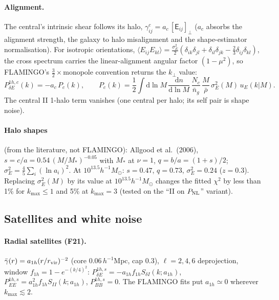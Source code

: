 \documentclass[11pt]{article}
\newcommand{\kmax}{k_{\max}}
\newcommand{\PNL}{P_{\rm NL}}
\newcommand{\dd}{\mathrm{d}}
\begin{document}
\paragraph{Alignment.} The central's intrinsic shear follows its halo,
$\gamma^c_{ij} = a_c\,[\mathsf E_{ij}]_\perp$ ($a_c$ absorbs the alignment strength,
the galaxy to halo misalignment and the shape-estimator normalisation). For
isotropic orientations,
$\langle E_{ij}E_{kl}\rangle = \tfrac{\sigma_E^2}{2}(\delta_{ik}\delta_{jl} + \delta_{il}\delta_{jk} - \tfrac23\delta_{ij}\delta_{kl})$,
the cross spectrum carries the linear-alignment angular factor $(1 - \mu^2)$, so
FLAMINGO's $\tfrac32\times$monopole convention returns the $k_\perp$ value:
\begin{equation}
\boxed{P^{1h,c}_{\delta E}(k) = -a_c\,P_c(k),\qquad
P_c(k) = \frac12\int\dd\ln M\,\frac{\dd n}{\dd\ln M}\,\frac{N_c}{\bar n_g}\,\frac{M}{\bar\rho}\,\sigma_E^2(M)\,u_E(k|M).}
\label{eq:central}
\end{equation}
The central II 1-halo term vanishes (one central per halo; its self pair is
shape noise).

\paragraph{Halo shapes} (from the literature, not FLAMINGO): Allgood et al.\ (2006),
$s = c/a = 0.54\,(M/M_*)^{-0.05}$ with $M_*$ at $\nu = 1$, $q = b/a = (1+s)/2$;
$\sigma_E^2 = \tfrac45\sum_i(\ln a_i)^2$. At $10^{13.5}h^{-1}M_\odot$: $s = 0.47$, $q = 0.73$,
$\sigma_E^2 = 0.24$ ($z = 0.3$). Replacing $\sigma_E^2(M)$ by its value at
$10^{13.5}h^{-1}M_\odot$ changes the fitted $\chi^2$ by less than 1\% for $\kmax \le 1$ and 5\% at $\kmax = 3$ (tested on the
``II on $\PNL$'' variant).

\subsection{Satellites and white noise}
\paragraph{Radial satellites (F21).} $\bar\gamma(r) = a_{1h}(r/r_{\rm vir})^{-2}$
(core $0.06\,h^{-1}$Mpc, cap 0.3), $\ell = 2, 4, 6$ deprojection, window
$f_{1h} = 1 - e^{-(k/4)^2}$:
$P^{1h,s}_{\delta E} = -a_{1h}f_{1h}S_{\delta I}(k; a_{1h})$,
$P^{1h,s}_{EE} = a_{1h}^2 f_{1h}S_{II}(k; a_{1h})$, $P^{1h,s}_{BB} = 0$.
The FLAMINGO fits put $a_{1h} \simeq 0$ wherever $\kmax \lesssim 2$.
\end{document}
